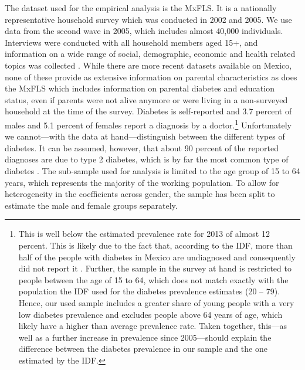The dataset used for the empirical analysis is the \acf{MxFLS}.
It is a nationally representative household survey which was conducted
in 2002 and 2005. We use data from the second wave in 2005, which
includes almost 40,000 individuals. Interviews were conducted with
all household members aged 15+, and information on a wide range of
social, demographic, economic and health related topics was collected
\parencite{Rubalcava2008}. While there are more recent datasets available
on Mexico, none of these provide as extensive information on parental
characteristics as does the \ac{MxFLS} which includes information
on parental diabetes and education status, even if parents were not
alive anymore or were living in a non-surveyed household at the time
of the survey. Diabetes is self-reported and 3.7 percent of males
and 5.1 percent of females report a diagnosis by a doctor.\footnote{
This is well below the estimated prevalence rate for 2013
of almost 12 percent. This is likely due to the fact that, according
to the \ac{IDF}, more than half of the people with diabetes in Mexico
are undiagnosed and consequently did not report it \parencite{InternationalDiabetesFederation2013}.
Further, the sample in the survey at hand is restricted to people
between the age of 15 to 64, which does not match exactly with the
population the \ac{IDF} used for the diabetes prevalence estimates
(20 -- 79). Hence, our used sample includes a greater share of young
people with a very low diabetes prevalence and excludes people above
64 years of age, which likely have a higher than average prevalence
rate. Taken together, this---as well as a further increase in prevalence
since 2005---should explain the difference between the diabetes
prevalence in our sample and the one estimated by the \ac{IDF}.
} Unfortunately we cannot---with the data at hand---distinguish
between the different types of diabetes. It can be assumed, however,
that about 90 percent of the reported diagnoses are due to type 2
diabetes, which is by far the most common type of diabetes \parencite{Sicree2009}.
The sub-sample used for analysis is limited to the age group of 15
to 64 years, which represents the majority of the working population.
To allow for heterogeneity in the coefficients across gender, the
sample has been split to estimate the male and female groups separately. 


